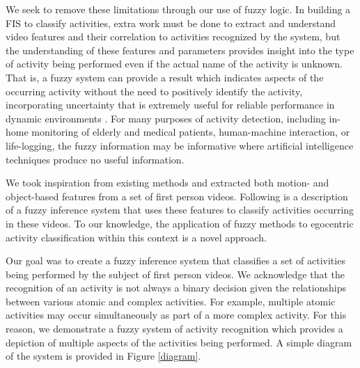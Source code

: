 \documentclass[12pt]{report}
\begin{document}
We seek to remove these limitations through our use of fuzzy logic. In building a FIS to classify activities, extra work must be done to extract and understand video features and their correlation to activities recognized by the system, but the understanding of these features and parameters provides insight into the type of activity being performed even if the actual name of the activity is unknown. That is, a fuzzy system can provide a result which indicates aspects of the occurring activity without the need to positively identify the activity, incorporating uncertainty that is extremely useful for reliable performance in dynamic environments \cite{Anderson2009}. For many purposes of activity detection, including in-home monitoring of elderly \cite{Banerjee2015, Anderson2009a} and medical patients, human-machine interaction, or life-logging, the fuzzy information may be informative where artificial intelligence techniques produce no useful information.

We took inspiration from existing methods and extracted both motion- and object-based features from a set of first person videos. Following is a description of a fuzzy inference system that uses these features to classify activities occurring in these videos. To our knowledge, the application of fuzzy methods to egocentric activity classification within this context is a novel approach.

Our goal was to create a fuzzy inference system that classifies a set of activities being performed by the subject of first person videos. We acknowledge that the recognition of an activity is not always a binary decision given the relationships between various atomic and complex activities. For example, multiple atomic activities may occur simultaneously as part of a more complex activity. For this reason, we demonstrate a fuzzy system of activity recognition which provides a depiction of multiple aspects of the activities being performed. A simple diagram of the system is provided in Figure \ref{diagram}.
\end{document}
